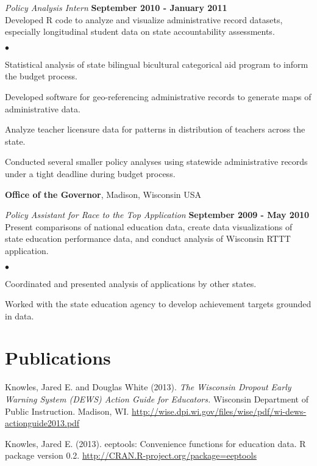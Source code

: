 \documentclass[margin,line]{res}
\newenvironment{list2}{
  \begin{list}{$\bullet$}{%
      \setlength{\itemsep}{0in}
      \setlength{\parsep}{0in} \setlength{\parskip}{0in}
      \setlength{\topsep}{0in} \setlength{\partopsep}{0in} 
      \setlength{\leftmargin}{0.2in}}}{\end{list}}
\begin{document}
\begin{resume}
\vspace{-.3cm}
{\em Policy Analysis Intern} \hfill {\bf September 2010 - January 2011}\\
Developed R code to analyze and visualize administrative record datasets, especially longitudinal student data on state accountability assessments. 
\begin{list2}
\item Statistical analysis of state bilingual bicultural categorical aid program to inform the budget process.
\item Developed software for geo-referencing administrative records to generate maps of administrative data.
\item Analyze teacher licensure data for patterns in distribution of teachers across the state.
\item Conducted several smaller policy analyses using statewide administrative records under a tight deadline during budget process.
\end{list2}

{\bf Office of the Governor}, Madison, Wisconsin USA

{\em Policy Assistant for Race to the Top Application} \hfill {\bf September 2009 - May 2010}\\
Present comparisons of national education data, create data visualizations of state education performance data, and conduct analysis of Wisconsin RTTT application. 
\begin{list2}
\item Coordinated and presented analysis of applications by other states.
\item Worked with the state education agency to develop achievement targets grounded in data.
\end{list2}

\vspace*{5mm}


\section{\sc Publications}

Knowles, Jared E. and Douglas White (2013). \emph{The Wisconsin Dropout Early Warning System (DEWS) Action Guide for Educators.} Wisconsin Department of Public Instruction. Madison, WI. \url{http://wise.dpi.wi.gov/files/wise/pdf/wi-dews-actionguide2013.pdf}

Knowles, Jared E. (2013). eeptools: Convenience functions for education data. R package
  version 0.2. \url{http://CRAN.R-project.org/package=eeptools}


\end{resume}
\end{document}
